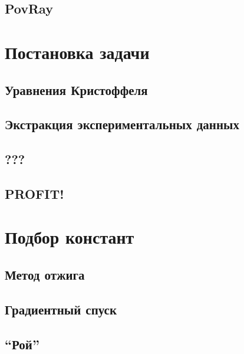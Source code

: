 \documentclass{beamer}
\begin{document}
\subsection{}\frame{}
%
\subsection{PovRay}\frame{}
%
\section{Постановка задачи}
\subsection{Уравнения Кристоффеля}
\subsection{Экстракция экспериментальных данных}
\subsection{???}
\subsection{PROFIT!}


\section{Подбор констант}
	\subsection{Метод отжига}\frame{}
	\subsection{Градиентный спуск}\frame{}
	\subsection{``Рой''}\frame{}
	
\end{document}
